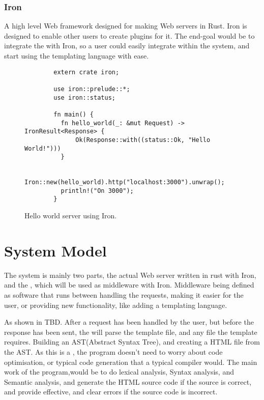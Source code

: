 \subsubsection{Iron}
A high level Web framework designed for making Web servers in Rust.\cite{Iron}
Iron is designed to enable other users to create plugins for it. The end-goal would be to integrate
the \compiler{} with Iron, so a user could easily integrate within the system, and start using the
templating language with ease.

\begin{figure}[ht!]
    \small
    \begin{verbatim}
        extern crate iron;

        use iron::prelude::*;
        use iron::status;

        fn main() {
          fn hello_world(_: &mut Request) -> IronResult<Response> {
              Ok(Response::with((status::Ok, "Hello World!")))
          }

          Iron::new(hello_world).http("localhost:3000").unwrap();
          println!("On 3000");
        }
    \end{verbatim}
    \caption{Hello world server using Iron.}
\end{figure}


\newpage

\section{System Model}
The system is mainly two parts, the actual Web server written in rust with Iron, and the \compiler{}, 
which will be used as middleware with Iron. Middleware being defined as software that runs between
handling the  requests, making it easier for the user, or providing new functionality, 
like adding a templating language.


As shown in TBD. After a request has been handled by the user, but before the response has been
sent, the \compiler{} will parse the template file, and any file the template requires. Building an 
AST(Abstract Syntax Tree), and creating a HTML file from the AST. As this is a \compiler{},
the program doesn't need to worry about code optimisation, or typical code generation
that a typical compiler would. The main work of the program,would be to do lexical analysis,
Syntax analysis, and Semantic analysis, and generate the HTML source code if the source is correct,
and provide effective, and clear errors if the source code is incorrect.

